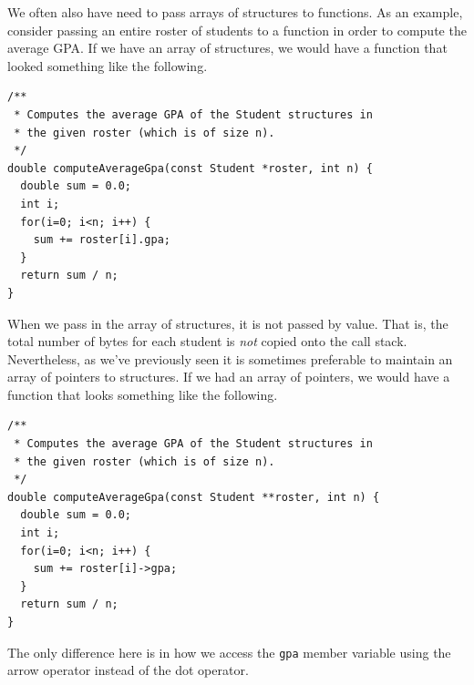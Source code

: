 We often also have need to pass arrays of structures to functions.
As an example, consider passing an entire roster of students to 
a function in order to compute the average GPA.  If we have an
array of structures, we would have a function that looked something
like the following.

\begin{verbatim}
/**
 * Computes the average GPA of the Student structures in
 * the given roster (which is of size n).
 */
double computeAverageGpa(const Student *roster, int n) {
  double sum = 0.0;
  int i;
  for(i=0; i<n; i++) {
    sum += roster[i].gpa;
  }
  return sum / n;
}
\end{verbatim}

When we pass in the array of structures, it is not passed by
value.  That is, the total number of bytes for each student is
\emph{not} copied onto the call stack.  Nevertheless, as we've
previously seen it is sometimes preferable to maintain an array
of pointers to structures.  If we had an array of pointers, we 
would have a function that looks something like the following.

\begin{verbatim}
/**
 * Computes the average GPA of the Student structures in
 * the given roster (which is of size n).
 */
double computeAverageGpa(const Student **roster, int n) {
  double sum = 0.0;
  int i;
  for(i=0; i<n; i++) {
    sum += roster[i]->gpa;
  }
  return sum / n;
}
\end{verbatim}

The only difference here is in how we access the \texttt{gpa}
member variable using the arrow operator instead of the dot 
operator.





